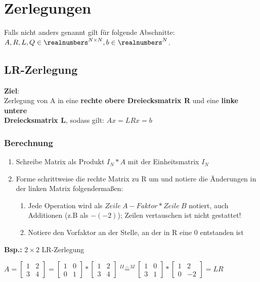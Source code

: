 \section{Zerlegungen}%
\label{zerl:sec:zerlegungen}
Falls nicht anders genannt gilt für folgende Abschnitte: $A, R, L, Q \in \realnumbers^{N \times N}, b \in \realnumbers^N$.

\subsection{LR-Zerlegung}%
\label{zerl:sub:lr}
\textbf{Ziel}:\\Zerlegung von A in eine \textbf{rechte obere Dreiecksmatrix R} und eine \textbf{linke untere\\Dreiecksmatrix L}, sodass gilt: $Ax = LRx = b$
\subsubsection{Berechnung}%
\label{zerl:ssub:berechnung}
\begin{enumerate}
	\item Schreibe Matrix als Produkt $I_N * A$ mit der Einheitsmatrix $I_N$
	\item Forme schrittweise die rechte Matrix zu R um und notiere die Änderungen in der linken Matrix folgendermaßen:
	\begin{enumerate}
		\item Jede Operation wird als $Zeile\ A - Faktor * Zeile\ B$ notiert, auch\\
		Additionen (z.B als $ - (-2)$); Zeilen vertauschen ist nicht gestattet!
		\item Notiere den Vorfaktor an der Stelle, an der in R eine 0 entstanden ist
	\end{enumerate}
\end{enumerate}
\textbf{Bsp.:} $2\times2$ LR-Zerlegung
\begin{center}
	$A = 
	\begin{bmatrix}1 & 2 \\ 3 & 4\end{bmatrix} =
	\begin{bmatrix}1 & 0 \\ 0 & 1\end{bmatrix} * \begin{bmatrix}1 & 2 \\ 3 & 4\end{bmatrix} \stackrel{II - 3I}{=}
	\begin{bmatrix}1 & 0 \\ 3 & 1\end{bmatrix} * \begin{bmatrix}1 & 2 \\ 0 & -2\end{bmatrix} = LR
	$	
\end{center}
